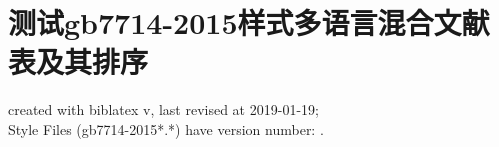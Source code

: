 \documentclass[twoside]{article}
\begin{document}
    \section{测试gb7714-2015样式多语言混合文献表及其排序}
    created with biblatex v\versionofbiblatex, last revised at 2019-01-19;\\ \hspace*{1.5em} Style Files (gb7714-2015*.*) have version number: \versionofgbtstyle.

	\nocite{*}

    \printbibliography

    
\end{document}
